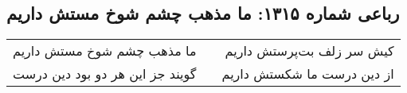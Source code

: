 \begin{center}
\section*{رباعی شماره ۱۳۱۵: ما مذهب چشم شوخ مستش داریم}
\label{sec:1315}
\begin{longtable}{l p{0.5cm} r}
ما مذهب چشم شوخ مستش داریم
&&
کیش سر زلف بت‌پرستش داریم
\\
گویند جز این هر دو بود دین درست
&&
از دین درست ما شکستش داریم
\\
\end{longtable}
\end{center}
